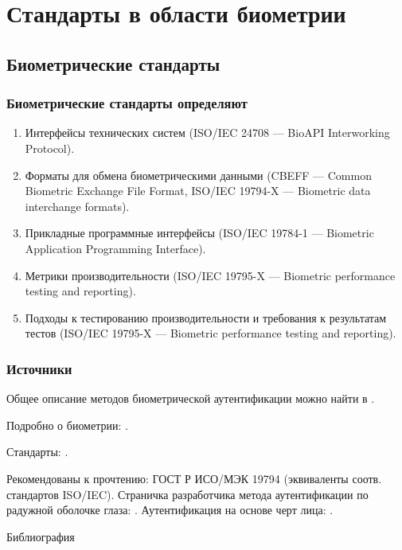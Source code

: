 \section{Стандарты в области биометрии}


\subsection{Биометрические стандарты}


\begin{frame}[allowframebreaks]
\frametitle{Биометрические стандарты определяют}
\begin{enumerate}
    \item Интерфейсы технических систем (ISO/IEC 24708 --- BioAPI Interworking Protocol).
    \item Форматы для обмена биометрическими данными (CBEFF --- Common Biometric Exchange File Format, ISO/IEC 19794-X --- Biometric data interchange formats).
    \item Прикладные программные интерфейсы (ISO/IEC 19784-1 --- Biometric Application Programming Interface).
    \item Метрики производительности (ISO/IEC 19795-X --- Biometric performance testing and reporting).
    \item Подходы к тестированию производительности и требования к результатам тестов (ISO/IEC 19795-X --- Biometric performance testing and reporting).
\end{enumerate}
\end{frame}


\appendix %


\begin{frame}
    \frametitle{Источники}
    Общее описание методов биометрической аутентификации можно найти в \cite{bib:chmora:crypto,bib:shangin:protect}.

    Подробно о биометрии: \cite{bib:misc:biocons,bib:misc:ibg,bib:misc:bioapi}.

    Стандарты: \cite{bib:misc:iso,bib:misc:incits}.

    Рекомендованы к прочтению: ГОСТ Р ИСО/МЭК 19794 (эквиваленты соотв. стандартов ISO/IEC). Страничка разработчика метода аутентификации по радужной оболочке глаза: \cite{bib:misc:daugmann}. Аутентификация на основе черт лица: \cite{bib:misc:facerec}.
\end{frame}


\begin{frame}[allowframebreaks]{Библиография}
    
    
\end{frame}


